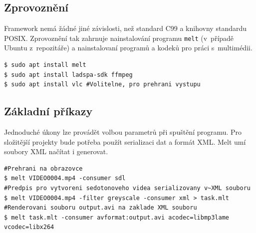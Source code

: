 \subsection{Zprovoznění}
Framework nemá žádné jiné závislosti, než standard C99 a knihovny standardu POSIX. Zprovoznění tak zahrnuje nainstalování programu \texttt{melt} (v~případě Ubuntu z~repozitáře) a nainstalovaní programů a kodeků pro práci s~multimédii.
\begin{lstlisting}[style=bash]
$ sudo apt install melt
$ sudo apt install ladspa-sdk ffmpeg
$ sudo apt install vlc #Volitelne, pro prehrani vystupu
\end{lstlisting}

\subsection{Základní příkazy}
Jednoduché úkony lze provádět volbou parametrů při spuštění programu. Pro složitější projekty bude potřeba použít serializaci dat a formát XML. Melt umí soubory XML načítat i generovat.
\begin{lstlisting}[style=bash]
#Prehrani na obrazovce
$ melt VIDEO0004.mp4 -consumer sdl
#Predpis pro vytvoreni sedotonoveho videa serializovany v~XML souboru
$ melt VIDEO0004.mp4 -filter greyscale -consumer xml > task.mlt 
#Renderovani souboru output.avi na zaklade XML souboru
$ melt task.mlt -consumer avformat:output.avi acodec=libmp3lame vcodec=libx264
\end{lstlisting}
